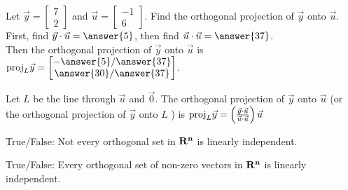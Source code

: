 \documentclass{ximera}
\newcommand{\RR}{\bf R}
\def\proj{\mathop{\rm proj}}
\begin{document}
  	  		 \begin{question} Let $\vec{y} = \begin{bmatrix} 7\\2\end{bmatrix}$ and $\vec{u} = \begin{bmatrix}
  	  		 	-1\\6\end{bmatrix}$. Find the orthogonal projection of $\vec{y}$ onto $\vec{u}$.\\
  	  		 	
  	  		 	First, find $\vec{y}\cdot\vec{u} = \answer{5}$, then find $\vec{u}\cdot\vec{u} = \answer{37}$.\\
  	  		 	
  	  		 	Then the orthogonal projection of $\vec{y}$ onto $\vec{u}$ is ${\proj}_L\vec{y} = \begin{bmatrix} -\answer{5}/\answer{37} \\\answer{30}/\answer{37} \end{bmatrix}$.\\
  	  		 	
  	  		 	\begin{hint}
  	  		 	Let $L$ be the line through $\vec{u}$ and $\vec{0}$. The orthogonal projection of $\vec{y}$ onto $\vec{u}$ (or the orthogonal projection of $\vec{y}$ onto $L$ ) is ${\proj}_L\vec{y} = \left(\frac{\vec{y}\cdot\vec{u}}{\vec{u}\cdot\vec{u}}\right)\vec{u}$ 
  	  		 		\end{hint}
  	  		 	
  	  		 	\end{question}
  	  		       \begin{question}True/False: Not every orthogonal set in $\RR^n$ is linearly independent.\\
  	  		       	 	\begin{multipleChoice}
  	  		       	 	\end{multipleChoice}
  	  		       	
  	  		       	\end{question}
  	  		          \begin{question}True/False: Every orthogonal set of non-zero vectors in $\RR^n$ is linearly independent.\\
  	  		          	\begin{multipleChoice}
  	  		          		\choice[correct]{True}
  	  		          		\choice{False}
  	  		          	\end{multipleChoice}
  	  		          	
  	  		          \end{question}
\end{document}
